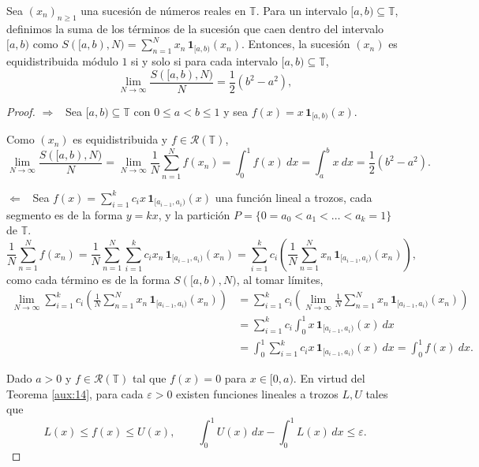 \begin{example}\label{E2.3}
    Sea $(x_n)_{n\geq1}$ una sucesión de números reales en $\mathbb{T}$. Para un intervalo 
    $[a,b) \subseteq \mathbb{T}$, definimos 
    la suma de los términos de la sucesión que caen dentro del intervalo $[a,b)$ como $S([a,b),N) = \sum_{n=1}^N x_n \, \mathbf{1}_{[a,b)}(x_n)$. Entonces, 
    la sucesión $(x_n)$ es equidistribuida módulo $1$ si y solo si para cada intervalo $[a,b) \subseteq \mathbb{T}$,
    \[
        \lim_{N \to \infty} \frac{S([a,b),N)}{N} = \frac{1}{2}(b^2-a^2),
    \]
\end{example}

\begin{proof}
    $\Longrightarrow$ \, Sea $[a,b) \subseteq \mathbb{T}$ con $0 \leq a < b\leq 1$ y sea $f(x) = x \, \mathbf{1}_{[a,b)}(x)$.
    
    Como $(x_n)$ es equidistribuida y $f \in \mathcal{R}(\mathbb{T})$,
    \[
        \lim_{N \to \infty} \frac{S([a,b),N)}{N} = 
        \lim_{N \to \infty} \frac{1}{N} \sum_{n=1}^N f(x_n) = 
        \int_0^1 f(x)\ dx = \int_a^b x\ dx = \frac{1}{2}(b^2-a^2).
    \]

    $\Longleftarrow$ \, Sea $f(x) = \sum_{i=1}^k c_i x \,\mathbf{1}_{[a_{i-1}, a_{i})}(x)$ una  
    función lineal a trozos, cada segmento es de la forma $y=kx$, y la partición 
    $P = \{0 = a_0 < a_1 < \ldots < a_k = 1\}$ de $\mathbb{T}$. 
    \[
        \frac{1}{N} \sum_{n=1}^N f(x_n) = 
        \frac{1}{N} \sum_{n=1}^N \sum_{i=1}^k c_i x_n \, \mathbf{1}_{[a_{i-1}, a_i)}(x_n) = 
        \sum_{i=1}^k c_i \left(\frac{1}{N} \sum_{n=1}^N x_n \,\mathbf{1}_{[a_{i-1}, a_i)}(x_n)\right),
    \]
    como cada término es de la forma $S([a,b),N)$, al tomar límites, 
    \begin{align*}
        \lim_{N \to \infty} \sum_{i=1}^k c_i \left(\frac{1}{N} \sum_{n=1}^N x_n \,\mathbf{1}_{[a_{i-1}, a_i)}(x_n)\right)
        &= \sum_{i=1}^k c_i \left(\lim_{N \to \infty} \frac{1}{N} \sum_{n=1}^N x_n \,\mathbf{1}_{[a_{i-1}, a_i)}(x_n)\right) \\
        &= \sum_{i=1}^k c_i \int_0^1 x \,\mathbf{1}_{[a_{i-1}, a_i)}(x)\ dx \\
        &= \int_0^1 \sum_{i=1}^k c_i x \,\mathbf{1}_{[a_{i-1}, a_i)}(x)\ dx 
        =\int_0^1 f(x)\ dx.
    \end{align*}

    Dado $a>0$ y $f \in \mathcal{R}(\mathbb{T})$ tal que $f(x)=0$ para $x \in [0,a)$.
    En virtud del Teorema \ref{aux:14}, para cada $\varepsilon > 0$ existen funciones lineales 
    a trozos $L,U$ tales que
    \[
        L(x) \leq f(x) \leq U(x), \qquad 
        \int_0^1 U(x) \, dx - \int_0^1 L(x) \, dx \leq \varepsilon.
    \]


\end{proof}
